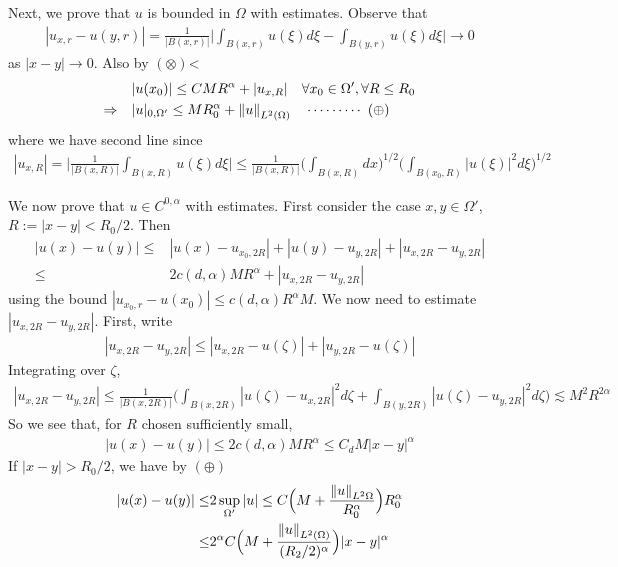 \documentclass[12pt,a4paper]{article}
\newenvironment{proof}
{\begin{changemargin}{0.5cm}{0.5cm} 
	}%
	{\end{changemargin}
}
\newenvironment{p}
{\begin{proof} 
	}%
	{\end{proof}
}
\begin{document}
\begin{p}
Next, we prove that $u$ is bounded in $\Omega$ with estimates. Observe that 
\begin{align*}
|u_{x, r} - u(y, r)| = \frac{1}{|B(x,r)|} \Big| \int_{B(x,r)} u(\xi) d\xi - \int_{B(y, r)} u(\xi) d\xi \Big| \rightarrow 0
\end{align*}
as $|x-y| \rightarrow 0$. Also by $(\otimes)$<
\begin{align*}
& |u(x_0)| \leq CM R^{\alpha} + |u_{x, R}| \quad \forall x_0 \in \Omega', \forall R\leq R_0 \\
\Rightarrow \quad & |u|_{0, \Omega'} \leq MR_0^{\alpha} + \snorms{u}{L^2(\Omega)} \call{\oplus}
\end{align*}
where we have second line since
\begin{align*}
|u_{x,R}| = \Big| \frac{1}{|B(x,R)|} \int_{B(x,R)} u(\xi) d\xi \Big| \leq \frac{1}{|B(x,R)|}\Big(\int_{B(x,R)} dx\Big)^{1/2} \Big(\int_{B(x_0, R)} |u(\xi)|^2 d\xi \Big)^{1/2}
\end{align*}
\s

We now prove that $u\in C^{0, \alpha}$ with estimates. First consider the case $x, y\in \Omega'$, $R:= |x-y| < R_0 /2$. Then
\begin{align*}
|u(x) - u(y)| \leq & |u(x)- u_{x_0, 2R}| + |u(y) - u_{y, 2R}| + |u_{x, 2R} - u_{y, 2R}| \\
\leq & 2c(d, \alpha) MR^{\alpha} + |u_{x, 2R} - u_{y, 2R}|
\end{align*}
using the bound $|u_{x_0, r} - u(x_0)| \leq c(d, \alpha) R^{\alpha}M$. We now need to estimate $|u_{x, 2R} - u_{y, 2R}|$. First, write
\begin{align*}
|u_{x, 2R} - u_{y, 2R}| \leq |u_{x, 2R} - u(\zeta)| + |u_{y, 2R} - u(\zeta)|
\end{align*}
Integrating over $\zeta$,
\begin{align*}
|u_{x,2R} - u_{y, 2R}| \leq \frac{1}{|B(x, 2R)|} \Big(\int_{B(x, 2R)} |u(\zeta) - u_{x, 2R}|^2 d\zeta + \int_{B(y, 2R)} |u(\zeta)- u_{y, 2R}|^2 d\zeta \Big) \lesssim  M^2 R^{2\alpha}
\end{align*}
So we see that, for $R$ chosen sufficiently small,
\begin{align*}
|u(x) - u(y)| \leq 2c(d, \alpha) MR^{\alpha} \leq C_d M |x-y|^{\alpha} 
\end{align*}
If $|x-y| > R_0/2$, we have by $(\oplus)$
\begin{align*}
|u(x)- u(y)| \leq & 2\sup_{\Omega'} |u| \leq C \Big(M + \frac{\snorms{u}{L^2{\Omega}}}{R_0^{\alpha}} \Big)R_0^{\alpha} \\
\leq & 2^{\alpha} C \Big(M + \frac{\snorms{u}{L^2(\Omega)}}{(R_2/2)^{\alpha}} \Big) |x-y|^{\alpha}
\end{align*}
\eop
\end{p}
\s
\end{document}
